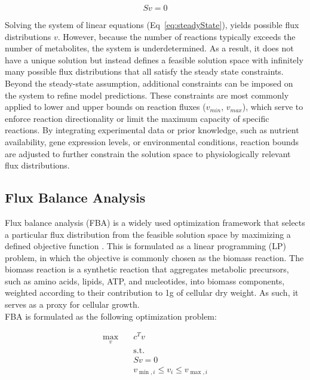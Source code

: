 \begin{equation}
    Sv = 0
    \label{eq:steadyState}
\end{equation}

Solving the system of linear equations (Eq~\ref{eq:steadyState}),  yields possible flux distributions $v$. However, because the number of reactions typically exceeds the number of metabolites, the system is underdetermined. As a result, it does not have a unique solution but instead defines a feasible solution space with infinitely many possible flux distributions that all satisfy the steady state constraints. 
\\

Beyond  the steady-state assumption, additional constraints can be imposed on the system to refine model predictions. These constraints are most commonly applied to lower and upper bounds on reaction fluxes ($v_{min}$, $v_{max}$),  which serve to enforce reaction directionality or limit the maximum capacity of specific reactions. By integrating experimental data or prior knowledge, such as nutrient availability, gene expression levels, or environmental conditions, reaction bounds are adjusted to further constrain the solution space to physiologically relevant flux distributions.

\subsection{Flux Balance Analysis}
Flux balance analysis (\gls{FBA}) is  a widely used optimization framework that selects a particular flux distribution from the feasible solution space by maximizing a defined objective function \citep{kauffmanAdvancesFluxBalance2003,savinellOptimalSelectionMetabolic1992}. 
This is formulated as a linear programming (\gls{LP}) problem, in which the objective is commonly chosen as the biomass reaction. The biomass reaction is a synthetic reaction that aggregates metabolic precursors, such as amino acids, lipids, ATP, and nucleotides, into biomass components, weighted according to their contribution to 1g of cellular dry weight. As such, it serves as a proxy for cellular growth. 
\\

FBA is formulated as the following optimization problem: 

\begin{equation}
    \label{eq:FBA}
    \begin{aligned}
    \max_{v} \quad & c^T v \\
    &\text{s.t.} \\
    \quad & Sv = 0 \\
    & v_{\min,i} \le v_i \le v_{\max,i}
    \end{aligned}
\end{equation}


